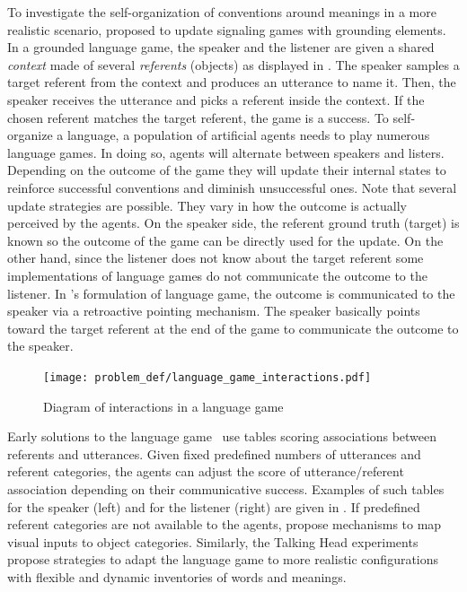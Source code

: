 To investigate the self-organization of conventions around meanings in a more realistic scenario, \citet{steels2012grounded} proposed to update signaling games with grounding elements.  In a grounded language game, the speaker and the listener are given a shared \textit{context} made of several \textit{referents} (objects) as displayed in . The speaker samples a target referent from the context and produces an utterance to name it. Then, the speaker receives the utterance and picks a referent inside the context. If the chosen referent matches the target referent, the game is a success. To self-organize a language, a population of artificial agents needs to play numerous language games. In doing so, agents will alternate between speakers and listers. Depending on the outcome of the game they will update their internal states to reinforce successful conventions and diminish unsuccessful ones. Note that several update strategies are possible. They vary in how the outcome is actually perceived by the agents. On the speaker side, the referent ground truth (target) is known so the outcome of the game can be directly used for the update. On the other hand, since the listener does not know about the target referent some implementations of language games do not communicate the outcome to the listener. In \citet{steels2001language}'s formulation of language game, the outcome is communicated to the speaker via a retroactive pointing mechanism. The speaker basically points toward the target referent at the end of the game to communicate the outcome to the speaker.

\begin{figure}[!h]
\centering
\texttt{[image: problem\_def/language\_game\_interactions.pdf]}	
\caption{Diagram of interactions in a language game}
\label{fig:language_game_interactions}
\end{figure}

Early solutions to the language game~\citep{steels1995selforganizing,batali1997learning,kirby2001spontaneous} use tables scoring associations between referents and utterances. Given fixed predefined numbers of utterances and referent categories, the agents can adjust the score of utterance/referent association depending on their communicative success. Examples of such tables for the speaker (left) and for the listener (right) are given in .  If predefined referent categories are not available to the agents, \citet{steels2012grounded} propose mechanisms to map visual inputs to object categories. Similarly, the Talking Head experiments~\citep{steels2015talkingheads} propose strategies to adapt the language game to more realistic configurations with flexible and dynamic inventories of words and meanings.

